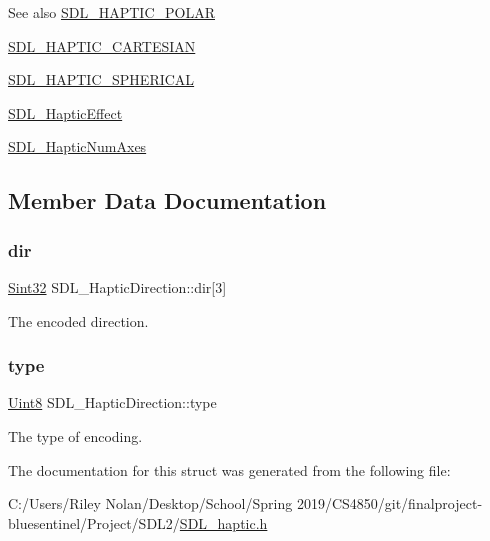 \begin{DoxySeeAlso}{See also}
\mbox{\hyperlink{_s_d_l__haptic_8h_acdc35e97e5525472054a67b76e518f3b}{S\+D\+L\+\_\+\+H\+A\+P\+T\+I\+C\+\_\+\+P\+O\+L\+AR}} 

\mbox{\hyperlink{_s_d_l__haptic_8h_af8b2430a363a968de2a5b64c8f663d3b}{S\+D\+L\+\_\+\+H\+A\+P\+T\+I\+C\+\_\+\+C\+A\+R\+T\+E\+S\+I\+AN}} 

\mbox{\hyperlink{_s_d_l__haptic_8h_a1fcf7cb0eaf3c39b16ba266054e25aff}{S\+D\+L\+\_\+\+H\+A\+P\+T\+I\+C\+\_\+\+S\+P\+H\+E\+R\+I\+C\+AL}} 

\mbox{\hyperlink{union_s_d_l___haptic_effect}{S\+D\+L\+\_\+\+Haptic\+Effect}} 

\mbox{\hyperlink{_s_d_l__haptic_8h_ad6705645197f6df4eeeea32392462483}{S\+D\+L\+\_\+\+Haptic\+Num\+Axes}} 
\end{DoxySeeAlso}


\subsection{Member Data Documentation}
\mbox{\label{struct_s_d_l___haptic_direction_a6cebd8118a3e61e36bd0c503ae020362}} 
\subsubsection{\texorpdfstring{dir}{dir}}
{\footnotesize\ttfamily \mbox{\hyperlink{_s_d_l__stdinc_8h_a7a90b941db9d4582e9ad7abb9940ff7e}{Sint32}} S\+D\+L\+\_\+\+Haptic\+Direction\+::dir\mbox{[}3\mbox{]}}

The encoded direction. \mbox{\label{struct_s_d_l___haptic_direction_acd6830ad68c4ba2af16057fa418087cc}} 
\subsubsection{\texorpdfstring{type}{type}}
{\footnotesize\ttfamily \mbox{\hyperlink{_s_d_l__stdinc_8h_a2944638813a090aa23e62f4da842c3e2}{Uint8}} S\+D\+L\+\_\+\+Haptic\+Direction\+::type}

The type of encoding. 

The documentation for this struct was generated from the following file\+:\begin{DoxyCompactItemize}
\item 
C\+:/\+Users/\+Riley Nolan/\+Desktop/\+School/\+Spring 2019/\+C\+S4850/git/finalproject-\/bluesentinel/\+Project/\+S\+D\+L2/\mbox{\hyperlink{_s_d_l__haptic_8h}{S\+D\+L\+\_\+haptic.\+h}}\end{DoxyCompactItemize}
